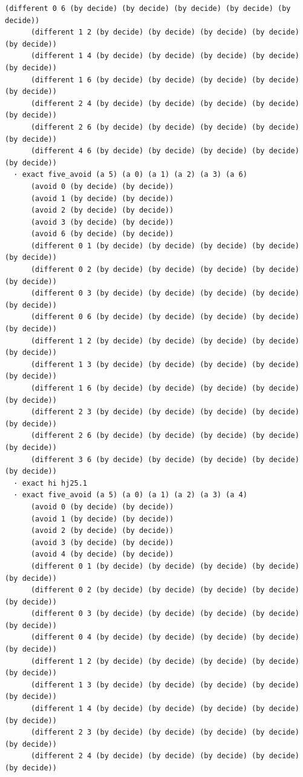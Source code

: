 \documentclass[11pt,a4paper]{article}
\begin{document}
\begin{Verbatim}[breaklines,breakanywhere,fontsize=\footnotesize]
      (different 0 6 (by decide) (by decide) (by decide) (by decide) (by decide))
      (different 1 2 (by decide) (by decide) (by decide) (by decide) (by decide))
      (different 1 4 (by decide) (by decide) (by decide) (by decide) (by decide))
      (different 1 6 (by decide) (by decide) (by decide) (by decide) (by decide))
      (different 2 4 (by decide) (by decide) (by decide) (by decide) (by decide))
      (different 2 6 (by decide) (by decide) (by decide) (by decide) (by decide))
      (different 4 6 (by decide) (by decide) (by decide) (by decide) (by decide))
  · exact five_avoid (a 5) (a 0) (a 1) (a 2) (a 3) (a 6)
      (avoid 0 (by decide) (by decide))
      (avoid 1 (by decide) (by decide))
      (avoid 2 (by decide) (by decide))
      (avoid 3 (by decide) (by decide))
      (avoid 6 (by decide) (by decide))
      (different 0 1 (by decide) (by decide) (by decide) (by decide) (by decide))
      (different 0 2 (by decide) (by decide) (by decide) (by decide) (by decide))
      (different 0 3 (by decide) (by decide) (by decide) (by decide) (by decide))
      (different 0 6 (by decide) (by decide) (by decide) (by decide) (by decide))
      (different 1 2 (by decide) (by decide) (by decide) (by decide) (by decide))
      (different 1 3 (by decide) (by decide) (by decide) (by decide) (by decide))
      (different 1 6 (by decide) (by decide) (by decide) (by decide) (by decide))
      (different 2 3 (by decide) (by decide) (by decide) (by decide) (by decide))
      (different 2 6 (by decide) (by decide) (by decide) (by decide) (by decide))
      (different 3 6 (by decide) (by decide) (by decide) (by decide) (by decide))
  · exact hi hj25.1
  · exact five_avoid (a 5) (a 0) (a 1) (a 2) (a 3) (a 4)
      (avoid 0 (by decide) (by decide))
      (avoid 1 (by decide) (by decide))
      (avoid 2 (by decide) (by decide))
      (avoid 3 (by decide) (by decide))
      (avoid 4 (by decide) (by decide))
      (different 0 1 (by decide) (by decide) (by decide) (by decide) (by decide))
      (different 0 2 (by decide) (by decide) (by decide) (by decide) (by decide))
      (different 0 3 (by decide) (by decide) (by decide) (by decide) (by decide))
      (different 0 4 (by decide) (by decide) (by decide) (by decide) (by decide))
      (different 1 2 (by decide) (by decide) (by decide) (by decide) (by decide))
      (different 1 3 (by decide) (by decide) (by decide) (by decide) (by decide))
      (different 1 4 (by decide) (by decide) (by decide) (by decide) (by decide))
      (different 2 3 (by decide) (by decide) (by decide) (by decide) (by decide))
      (different 2 4 (by decide) (by decide) (by decide) (by decide) (by decide))

\end{Verbatim}
\end{document}
